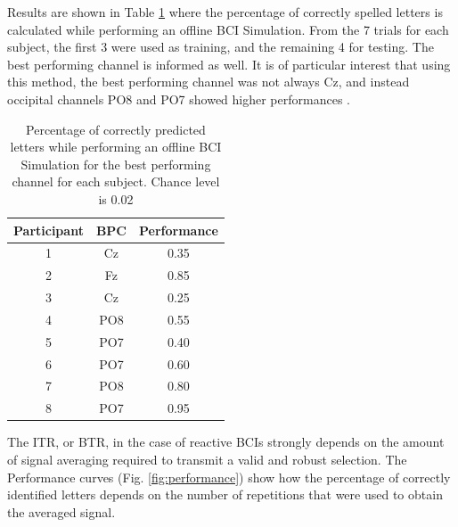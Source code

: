 \documentclass[entropy,article,submit,moreauthors,pdftex,10pt,a4paper]{mdpi}
\begin{document}
Results are shown in Table \ref{tab:results} where the percentage of correctly spelled letters is calculated while performing an offline BCI Simulation.  From the 7 trials for each subject, the first 3 were used as training, and the remaining 4 for testing.  The best performing channel is informed as well.  It is of particular interest that using this method, the best performing channel was not always Cz, and instead occipital channels PO8 and PO7 showed higher performances \citep{Huggins2016,Jure2016}.


\begin{table}[H]
\caption{Percentage of correctly predicted letters while performing an offline BCI Simulation for the best performing channel for each subject. Chance level is 0.02 }
\centering
\begin{tabular}{ccc}
\toprule
\textbf{Participant}	&  \textbf{BPC}	& \textbf{Performance}\\
\midrule
1     &     Cz   &   0.35  \\
2     &     Fz   &   0.85  \\
3     &     Cz   &   0.25  \\
4     &     PO8 &   0.55  \\
5     &     PO7 &   0.40 \\
6     &     PO7 &   0.60  \\
7     &     PO8 &   0.80  \\
8     &     PO7 &   0.95 \\

\bottomrule
\end{tabular}
\label{tab:results}
\end{table}

The ITR, or BTR, in the case of reactive BCIs \citep{WolpawJonathanR2012} strongly depends on the amount of signal averaging required to transmit a valid and robust selection.  The Performance curves (Fig. \ref{fig:performance}) show how the percentage of correctly identified letters depends on the number of repetitions that were used to obtain the averaged signal.
\end{document}
